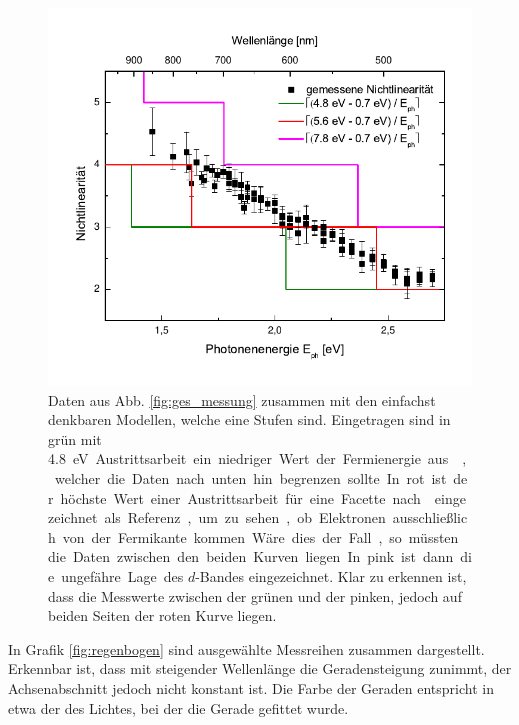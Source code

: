\documentclass[bachelor,       %
               twoside,        %
               BCOR10mm,       %
               english,ngerman, %
               ]{GAUBM}
\begin{document}
\begin{figure}[h]
	\centering
	\includegraphics{Stufen}
	\caption{Daten aus Abb. \ref{fig:ges_messung} zusammen mit den einfachst denkbaren Modellen, welche eine Stufen sind. Eingetragen sind in grün mit \SI{4.8}\eV Austrittsarbeit ein niedriger Wert der Fermienergie aus \cite{trasatti_operative_1974}, welcher die Daten nach unten hin begrenzen sollte. In rot ist der höchste Wert einer Austrittsarbeit für eine Facette nach \cite{gold_hoch} eingezeichnet als Referenz, um zu sehen, ob Elektronen ausschließlich von der Fermikante kommen. Wäre dies der Fall, so müssten die Daten zwischen den beiden Kurven liegen. In pink ist dann die ungefähre Lage des $d$-Bandes eingezeichnet. Klar zu erkennen ist, dass die Messwerte zwischen der grünen und der pinken, jedoch auf beiden Seiten der roten Kurve liegen.}
	\label{fig:stufen}
\end{figure}


In Grafik \ref{fig:regenbogen} sind ausgewählte Messreihen zusammen dargestellt.
Erkennbar ist, dass mit steigender Wellenlänge die Geradensteigung zunimmt, der Achsenabschnitt jedoch nicht konstant ist.
Die Farbe der Geraden entspricht in etwa der des Lichtes, bei der die Gerade gefittet wurde.
\end{document}
